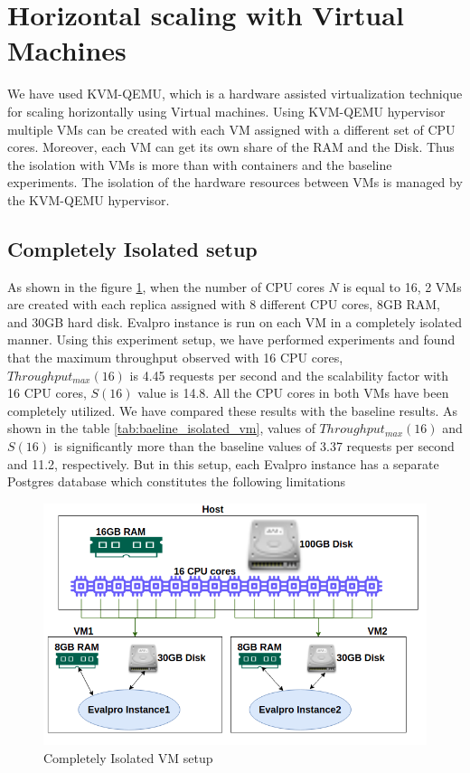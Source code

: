 \documentclass{iitbreport}
\begin{document}
\section{Horizontal scaling with Virtual Machines}
We have used KVM-QEMU, which is a hardware assisted virtualization technique for scaling horizontally using Virtual machines. Using KVM-QEMU hypervisor multiple VMs can be created with each VM assigned with a different set of CPU cores. Moreover, each VM can get its own share of the RAM and the Disk. Thus the isolation with VMs is more than with containers and the baseline experiments. The isolation of the hardware resources between VMs is managed by the KVM-QEMU hypervisor.
\subsection{Completely Isolated setup}\label{isolated_setup_16}
As shown in the figure \ref{isolated_vm}, when the number of CPU cores $N$ is equal to 16, 2 VMs are created with each replica assigned with 8 different CPU cores, 8GB RAM, and 30GB hard disk. Evalpro instance is run on each VM in a completely isolated manner. Using this experiment setup, we have performed experiments and found that the maximum throughput observed with 16 CPU cores, $Throughput_{max}(16)$ is 4.45 requests per second and the  scalability factor with 16 CPU cores, $S(16)$ value is 14.8. All the CPU cores in both VMs have been completely utilized. We have compared these results with the baseline results. As shown in the table \ref{tab:baeline_isolated_vm}, values of $Throughput_{max}(16)$ and $S(16)$ is significantly more than the baseline values of 3.37 requests per second and 11.2, respectively. But in this setup, each Evalpro instance has a separate Postgres database which constitutes the following limitations 
\begin{figure}[!htb]
  \centering
  \includegraphics[width=\linewidth]{Images/isolated_vm.png}
  \caption{Completely Isolated VM setup}
  \label{isolated_vm}
\end{figure}
\end{document}
